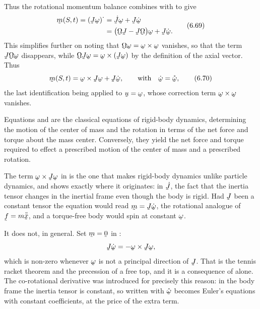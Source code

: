 Thus the rotational momentum balance  combines with
 to give
\begin{equation}
\begin{aligned}
   \bm(S,t)=(\vek{J}\bom)^{\textstyle\cdot}
   &=\dot{\vek{J}}\bom+\vek{J}\dot\bom\\
   &=\big(\bOm\vek{J}-\vek{J}\bOm\big)\bom+\vek{J}\dot\bom .
\end{aligned}
   \tag{6.69}\label{eq:6.69}
\end{equation}
This simplifies further on noting that $\bOm\bom=\bom\times\bom$
vanishes, so that the term $\vek{J}\bOm\bom$ disappears, while
$\bOm\vek{J}\bom=\bom\times(\vek{J}\bom)$ by the definition of the
axial vector. Thus
\begin{equation}
   \bm(S,t)=\bom\times\vek{J}\bom+\vek{J}\dot\bom ,
   \qquad\text{with}\quad\dot\bom=\mathring{\bom} ,
   \tag{6.70}\label{eq:6.70}
\end{equation}
the last identification being  applied to $\bu=\bom$, whose
correction term $\bom\times\bom$ vanishes.

Equations  and  are the classical equations of
rigid-body dynamics, determining the motion of the center of mass and
the rotation in terms of the net force and torque about the mass
center. Conversely, they yield the net force and torque required to
effect a prescribed motion of the center of mass and a prescribed
rotation.

\begin{remark}\label{rem:ch6gyro}
The term $\bom\times\vek{J}\bom$ in  is the one that makes
rigid-body dynamics unlike particle dynamics, and  shows
exactly where it originates: in $\dot{\vek{J}}$, the fact that the
inertia tensor changes in the inertial frame even though the body is
rigid. Had $\vek{J}$ been a constant tensor the equation would read
$\bm=\vek{J}\dot\bom$, the rotational analogue of $\vek{f}=m\ddot
{\bar{\bx}}$, and a torque-free body would spin at constant $\bom$.

It does not, in general. Set $\bm=\bze$ in :
\[
   \vek{J}\dot\bom=-\bom\times\vek{J}\bom ,
\]
which is non-zero whenever $\bom$ is not a principal direction of
$\vek{J}$. That is the tennis racket theorem and the precession of a
free top, and it is a consequence of  alone. The
co-rotational derivative was introduced for precisely this reason: in
the body frame the inertia tensor is constant, so  written
with $\mathring{\bom}$ becomes Euler's equations with constant
coefficients, at the price of the extra term.
\end{remark}

